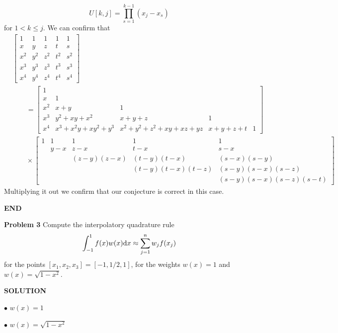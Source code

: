 \documentclass[12pt,a4paper]{article}
\begin{document}
\[
U[k,j] = \ensuremath{\prod}_{s = 1}^{k-1} (x_j-x_s)
\]
for $1 < k \ensuremath{\leq} j$. We can confirm that
\begin{align*}
&\begin{bmatrix}
1 & 1 & 1 & 1 & 1 \\
x & y & z & t & s\\
x^2 & y^2 & z^2 & t^2 & s^2 \\
x^3 & y^3 & z^3 & t^3 & s^3 \\
x^4 & y^4 & z^4 & t^4 & s^4
\end{bmatrix} \\
&\qquad =
\begin{bmatrix}
1 &  \\
x & 1 \\
x^2 & x+y  & 1 \\
x^3 &y^2 + xy + x^2  & x+ y + z & 1 \\
x^4 & x^3 + x^2 y + x y^2 + y^3 & x^2 + y^2 + z^2 + xy + xz + yz  & x + y + z + t & 1
\end{bmatrix} \\
&\qquad \ensuremath{\times}
\begin{bmatrix}
1 & 1 & 1 & 1 & 1\\
 & y-x & z-x & t-x & s-x  \\
 &  & (z-y)(z-x) & (t-y)(t-x) & (s-x) (s-y) \\
 &  &  & (t-y)(t-x)(t-z) &   (s-y)(s-x)(s-z)  \\
 &  &  &  &   (s-y)(s-x)(s-z)(s-t)
\end{bmatrix}
\end{align*}
Multiplying it out we confirm that our conjecture is correct in this case.

\textbf{END}

\textbf{Problem 3} Compute the interpolatory quadrature rule
\[
\int_{-1}^1 f(x) w(x) {\rm d} x \approx \sum_{j=1}^n w_j f(x_j)
\]
for the points $[x_1,x_2,x_3] = [-1,1/2,1]$, for the weights $w(x) = 1$ and $w(x) = \sqrt{1-x^2}$.

\textbf{SOLUTION}

\ensuremath{\bullet} $w(x) = 1$

\ensuremath{\bullet} $w(x) = \sqrt{1-x^2}$
\end{document}
